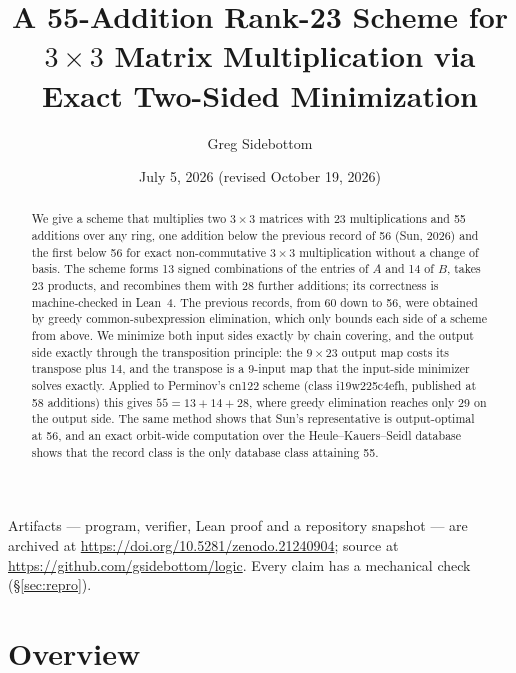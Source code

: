 \documentclass[10pt]{article}
\title{\bfseries A 55-Addition Rank-23 Scheme for $3\times 3$ Matrix
  Multiplication via Exact Two-Sided Minimization}
\author{Greg Sidebottom}
\date{July 5, 2026 (revised October 19, 2026)}
\begin{document}
\maketitle
\vspace{-1.5em}
\begin{center}
\small Artifacts --- program, verifier, Lean proof and a repository
snapshot --- are archived at
\url{https://doi.org/10.5281/zenodo.21240904}; source at
\url{https://github.com/gsidebottom/logic}.  Every claim has a
mechanical check (\S\ref{sec:repro}).
\end{center}

\begin{abstract}
We give a scheme that multiplies two $3\times3$ matrices with 23
multiplications and 55 additions over any ring, one addition below the
previous record of 56 (Sun, 2026) and the first below 56 for exact
non-commutative $3\times3$ multiplication without a change of basis.  The
scheme forms 13 signed combinations of the entries of $A$ and 14 of $B$,
takes 23 products, and recombines them with 28 further additions; its
correctness is machine-checked in Lean~4.  The previous records, from 60
down to 56, were obtained by greedy common-subexpression elimination,
which only bounds each side of a scheme from above.  We minimize both
input sides exactly by chain covering, and the output side exactly
through the transposition principle: the $9\times23$ output map costs
its transpose plus 14, and the transpose is a 9-input map that the
input-side minimizer solves exactly.  Applied to Perminov's cn122 scheme
(class i19w225c4efh, published at 58 additions) this gives
$55 = 13 + 14 + 28$, where greedy elimination reaches only 29 on the
output side.  The same method shows that Sun's representative is
output-optimal at 56, and an exact orbit-wide computation over the
Heule--Kauers--Seidl database shows that the record class is the only
database class attaining 55.
\end{abstract}

\section{Overview}\label{sec:overview}
\end{document}
